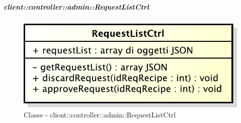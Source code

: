 		\subparagraph{client::controller::admin::RequestListCtrl} %
		\label{subp:bdsm_app_client_controller_admin_requestlistctrl}
			\begin{figure}[htbp]
				\centering
				\centerline{\includegraphics[scale=0.7]{./images/client/classes/controller/request_list_ctrl.pdf}}
				\caption{Classe - client::controller::admin::RequestListCtrl}
			\end{figure}

